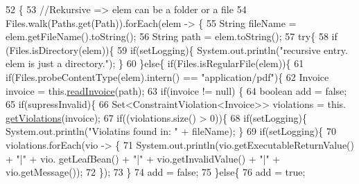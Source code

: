 \begin{DoxyCode}
52                                                                                                            
                                                                           \{
53         \textcolor{comment}{//Rekursive => elem can be a folder or a file }
54         Files.walk(Paths.get(Path)).forEach(elem -> \{
55             String fileName = elem.getFileName().toString();
56             String path = elem.toString();
57             \textcolor{keywordflow}{try}\{
58                 \textcolor{keywordflow}{if} (Files.isDirectory(elem))\{
59                     \textcolor{keywordflow}{if}(setLogging)\{ System.out.println(\textcolor{stringliteral}{"recursive entry. elem is just a directory."}); \}
60                 \}\textcolor{keywordflow}{else}\{  \textcolor{keywordflow}{if}(Files.isRegularFile(elem))\{
61                     \textcolor{keywordflow}{if}(Files.probeContentType(elem).intern() == \textcolor{stringliteral}{"application/pdf"})\{
62                         Invoice invoice = this.\hyperlink{class_import_1_1zugferd_handler_aea79c23595f003c943e908c95276ecf9}{readInvoice}(path);
63                         \textcolor{keywordflow}{if}(invoice != null) \{
64                             \textcolor{keywordtype}{boolean} add = \textcolor{keyword}{false};
65                             \textcolor{keywordflow}{if}(supressInvalid)\{
66                                 Set<ConstraintViolation<Invoice>> violations = this.
      \hyperlink{class_import_1_1zugferd_handler_acf26740b73f820812fadb01ccf712dd2}{getViolations}(invoice);
67                                 \textcolor{keywordflow}{if}((violations.size() > 0))\{
68                                     \textcolor{keywordflow}{if}(setLogging)\{ System.out.println(\textcolor{stringliteral}{"Violatins found in: "} + fileName); 
      \}
69                                     \textcolor{keywordflow}{if}(setLogging)\{ 
70                                         violations.forEach(vio -> \{
71                                             System.out.println(vio.getExecutableReturnValue() + \textcolor{stringliteral}{"|"} + vio.
      getLeafBean() + \textcolor{stringliteral}{"|"} + vio.getInvalidValue() + \textcolor{stringliteral}{"|"} + vio.getMessage());
72                                         \});
73                                     \}
74                                     add = \textcolor{keyword}{false};
75                                 \}\textcolor{keywordflow}{else}\{
76                                     add = \textcolor{keyword}{true};

\end{DoxyCode}
